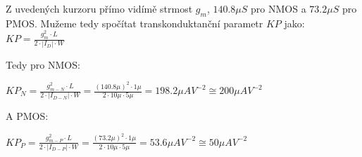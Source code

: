 Z uvedených kurzoru přímo vidímě strmost \(g_m\), \(140.8 \mu S\) pro NMOS a \(73.2 \mu S\) pro PMOS.
Mužeme tedy spočítat transkonduktanční parametr \(KP\) jako:\\


\Large
\(
    KP = \frac{g_m^2\cdot L}{2\cdot|I_D|\cdot W}
\)
\normalsize

Tedy pro NMOS:

\Large
\(
    KP_N = \frac{g_{m-N}^2\cdot L}{2\cdot|I_{D-N}|\cdot W} = \frac{(140.8\mu)^2\cdot1\mu}{2\cdot10\mu\cdot5\mu} = 198.2\mu A V^{-2} \cong 200 \mu A V^{-2}
\)
\normalsize

A PMOS:

\Large
\(
    KP_P = \frac{g_{m-P}^2\cdot L}{2\cdot|I_{D-P}|\cdot W} = \frac{(73.2\mu)^2\cdot1\mu}{2\cdot10\mu\cdot5\mu} = 53.6\mu A V^{-2} \cong  50 \mu A V^{-2}
\)
\normalsize
